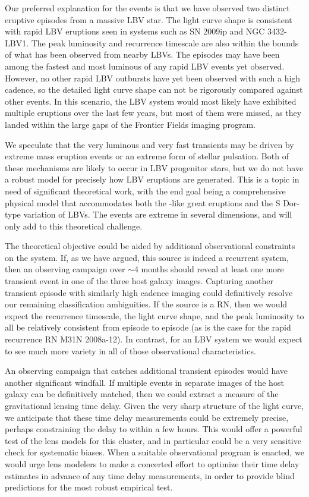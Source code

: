 Our preferred explanation for the \spock events is that we have
observed two distinct eruptive episodes from a massive LBV star.  The
light curve shape is consistent with rapid LBV eruptions seen in
systems such as SN 2009ip and NGC 3432-LBV1.  The peak luminosity and
recurrence timescale are also within the bounds of what has been
observed from nearby LBVs.  The \spock episodes may have been among
the fastest and most luminous of any rapid LBV events yet
observed. However, no other rapid LBV outbursts have yet been observed
with such a high cadence, so the detailed light curve shape can not be
rigorously compared against other events.  In this scenario, the
\spock LBV system would most likely have exhibited multiple eruptions
over the last few years, but most of them were missed, as they landed
within the large gaps of the \HST Frontier Fields imaging program.

We speculate that the very luminous and very fast \spock transients
may be driven by extreme mass eruption events or an extreme form of
stellar pulsation.  Both of these mechanisms are likely to occur in
LBV progenitor stars, but we do not have a robust model for precisely
how LBV eruptions are generated. This is a topic in need of
significant theoretical work, with the end goal being a comprehensive
physical model that accommodates both the \etacar-like great eruptions
and the S Dor-type variation of LBVs.  The \spock events are extreme
in several dimensions, and will only add to this theoretical
challenge.

The theoretical objective could be aided by additional observational
constraints on the \spock system.  If, as we have argued, this source
is indeed a recurrent system, then an observing campaign over $\sim$4
months should reveal at least one more transient event in one of the
three host galaxy images.  Capturing another transient episode with
similarly high cadence imaging could definitively resolve our
remaining classification ambiguities.  If the \spock source is a RN,
then we would expect the recurrence timescale, the light curve shape,
and the peak luminosity to all be relatively consistent from episode
to episode (as is the case for the rapid recurrence RN M31N 2008a-12).
In contrast, for an LBV system we would expect to see much more
variety in all of those observational characteristics.

An observing campaign that catches additional transient episodes would
have another significant windfall.  If multiple events in separate
images of the host galaxy can be definitively matched, then we could
extract a measure of the gravitational lensing time delay.  Given the
very sharp structure of the light curve, we anticipate that these time
delay measurements could be extremely precise, perhaps constraining
the delay to within a few hours.  This would offer a powerful test of
the lens models for this cluster, and in particular could be a very
sensitive check for systematic biases.  When a suitable observational
program is enacted, we would urge lens modelers to make a concerted
effort to optimize their time delay estimates in advance of any time
delay measurements, in order to provide blind predictions for the most
robust empirical test.
